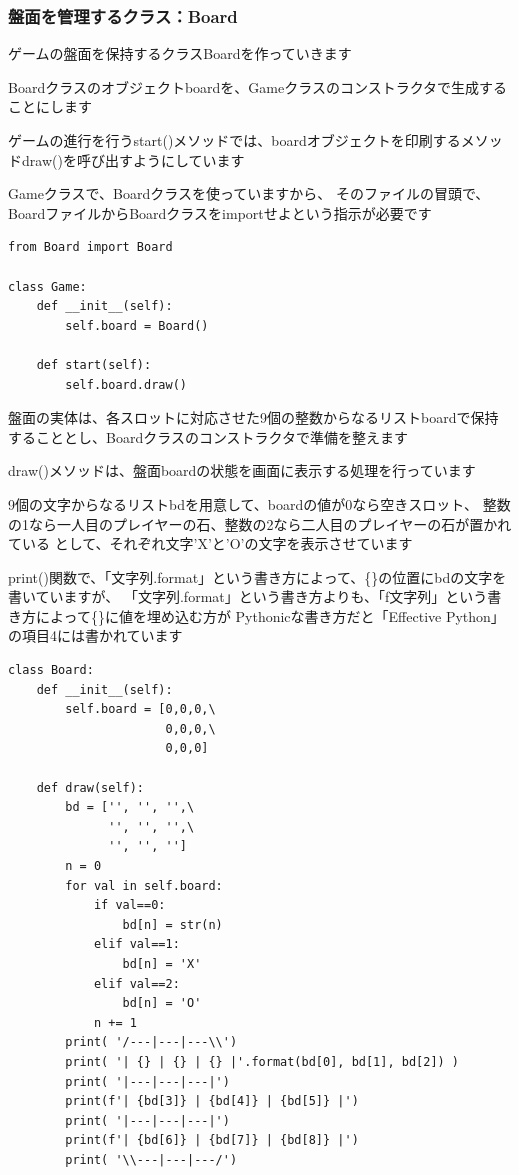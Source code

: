 \documentclass[uplatex,a4paper,11pt,oneside,openany]{jsbook}
\begin{document}
\subsubsection{盤面を管理するクラス：Board}

ゲームの盤面を保持するクラスBoardを作っていきます

Boardクラスのオブジェクトboardを、Gameクラスのコンストラクタで生成することにします

ゲームの進行を行うstart()メソッドでは、boardオブジェクトを印刷するメソッドdraw()を呼び出すようにしています

Gameクラスで、Boardクラスを使っていますから、
そのファイルの冒頭で、BoardファイルからBoardクラスをimportせよという指示が必要です

\begin{lstlisting}[caption=class Game,label=prog02-1]
from Board import Board

class Game:
    def __init__(self):
        self.board = Board()

    def start(self):
        self.board.draw()
\end{lstlisting}%

盤面の実体は、各スロットに対応させた9個の整数からなるリストboardで保持することとし、Boardクラスのコンストラクタで準備を整えます

draw()メソッドは、盤面boardの状態を画面に表示する処理を行っています

9個の文字からなるリストbdを用意して、boardの値が0なら空きスロット、
整数の1なら一人目のプレイヤーの石、整数の2なら二人目のプレイヤーの石が置かれている
として、それぞれ文字'X'と'O'の文字を表示させています

print()関数で、「文字列.format」という書き方によって、\{\}の位置にbdの文字を書いていますが、
「文字列.format」という書き方よりも、「f文字列」という書き方によって\{\}に値を埋め込む方が
Pythonicな書き方だと「Effective Python」の項目4には書かれています

\begin{lstlisting}[caption=class Board,label=prog02-2]
class Board:
    def __init__(self):
        self.board = [0,0,0,\
                      0,0,0,\
                      0,0,0]

    def draw(self):
        bd = ['', '', '',\
              '', '', '',\
              '', '', '']
        n = 0
        for val in self.board:
            if val==0:
                bd[n] = str(n)
            elif val==1:
                bd[n] = 'X'
            elif val==2:
                bd[n] = 'O'
            n += 1
        print( '/---|---|---\\')
        print( '| {} | {} | {} |'.format(bd[0], bd[1], bd[2]) )
        print( '|---|---|---|')
        print(f'| {bd[3]} | {bd[4]} | {bd[5]} |')
        print( '|---|---|---|')
        print(f'| {bd[6]} | {bd[7]} | {bd[8]} |')
        print( '\\---|---|---/')
\end{lstlisting}%
\end{document}
